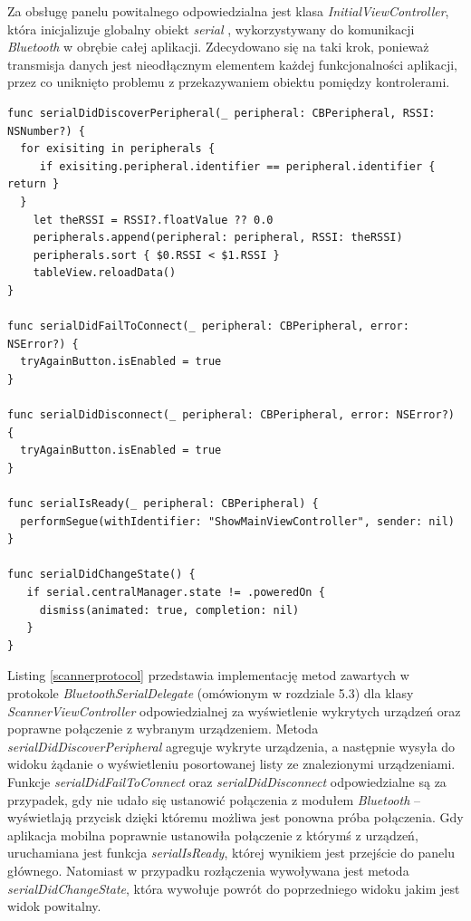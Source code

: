 Za obsługę panelu powitalnego odpowiedzialna jest klasa \textit{InitialViewController}, która inicjalizuje globalny obiekt \textit{serial} , wykorzystywany do komunikacji \textit{Bluetooth} w obrębie całej aplikacji. Zdecydowano się na taki krok, ponieważ transmisja danych jest nieodłącznym elementem każdej funkcjonalności aplikacji, przez co uniknięto problemu z przekazywaniem obiektu pomiędzy kontrolerami.

\begin{minipage}{\textwidth}
	\begin{lstlisting}[label=scannerprotocol,caption=Implementacja protokołu.]
func serialDidDiscoverPeripheral(_ peripheral: CBPeripheral, RSSI: NSNumber?) {
  for exisiting in peripherals {
     if exisiting.peripheral.identifier == peripheral.identifier { return }
  }
    let theRSSI = RSSI?.floatValue ?? 0.0
    peripherals.append(peripheral: peripheral, RSSI: theRSSI)
    peripherals.sort { $0.RSSI < $1.RSSI }
    tableView.reloadData()
}
  
func serialDidFailToConnect(_ peripheral: CBPeripheral, error: NSError?) {
  tryAgainButton.isEnabled = true
}
  
func serialDidDisconnect(_ peripheral: CBPeripheral, error: NSError?) {
  tryAgainButton.isEnabled = true
}
  
func serialIsReady(_ peripheral: CBPeripheral) {
  performSegue(withIdentifier: "ShowMainViewController", sender: nil)
}
  
func serialDidChangeState() {
   if serial.centralManager.state != .poweredOn {
     dismiss(animated: true, completion: nil)
   }
}
	\end{lstlisting}
\end{minipage}

Listing \ref{scannerprotocol} przedstawia implementację metod zawartych w protokole \textit{BluetoothSerialDelegate} (omówionym w rozdziale 5.3) dla klasy \textit{ScannerViewController} odpowiedzialnej za wyświetlenie wykrytych urządzeń oraz poprawne połączenie z wybranym urządzeniem. Metoda \textit{serialDidDiscoverPeripheral} agreguje wykryte urządzenia, a następnie wysyła do widoku żądanie o wyświetleniu posortowanej listy ze znalezionymi urządzeniami. Funkcje \textit{serialDidFailToConnect} oraz \textit{serialDidDisconnect} odpowiedzialne są za przypadek, gdy nie udało się ustanowić połączenia z modułem \textit{Bluetooth} – wyświetlają przycisk dzięki któremu możliwa jest ponowna próba połączenia. Gdy aplikacja mobilna poprawnie ustanowiła połączenie z którymś z urządzeń, uruchamiana jest funkcja \textit{serialIsReady}, której wynikiem jest przejście do panelu głównego.  Natomiast w przypadku rozłączenia wywoływana jest metoda \textit{serialDidChangeState}, która wywołuje powrót do poprzedniego widoku jakim jest widok powitalny.

